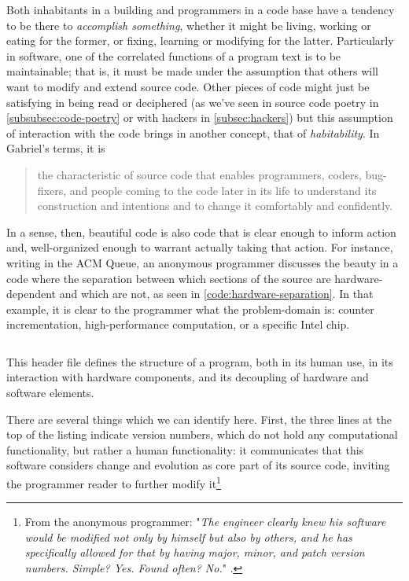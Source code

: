 Both inhabitants in a building and programmers in a code base have a tendency to be there to \emph{accomplish something}, whether it might be living, working or eating for the former, or fixing, learning or modifying for the latter. Particularly in software, one of the correlated functions of a program text is to be maintainable; that is, it must be made under the assumption that others will want to modify and extend source code. Other pieces of code might just be satisfying in being read or deciphered (as we've seen in source code poetry in \ref{subsubsec:code-poetry} or with hackers in \ref{subsec:hackers}) but this assumption of interaction with the code brings in another concept, that of \emph{habitability}. In Gabriel's terms, it is

\begin{quote}
    the characteristic of source code that enables programmers, coders, bug-fixers, and people coming to the code later in its life to understand its construction and intentions and to change it comfortably and confidently. \citep{gabriel_patterns_1998}
\end{quote}

In a sense, then, beautiful code is also code that is clear enough to inform action and, well-organized enough to warrant actually taking that action. For instance, writing in the ACM Queue, an anonymous programmer discusses the beauty in a code where the separation between which sections of the source are hardware-dependent and which are not, as seen in \ref{code:hardware-separation}. In that example, it is clear to the programmer what the problem-domain is: counter incrementation, high-performance computation, or a specific Intel chip.

\begin{listing}
    \inputminted{c}{./corpus/hardware_separation.h}
    \caption{This header file defines the structure of a program, both in its human use, in its interaction with hardware components, and its decoupling of hardware and software elements.}
    \label{code:hardware-separation}
\end{listing}

There are several things which we can identify here. First, the three lines at the top of the listing indicate version numbers, which do not hold any computational functionality, but rather a human functionality: it communicates that this software considers change and evolution as core part of its source code, inviting the programmer reader to further modify it\footnote{From the anonymous programmer: "\emph{The engineer clearly knew his software would be modified not only by himself but also by others, and he has specifically allowed for that by having major, minor, and patch version numbers. Simple? Yes. Found often? No.}" \citep{vicious_beautiful_2008}.}

